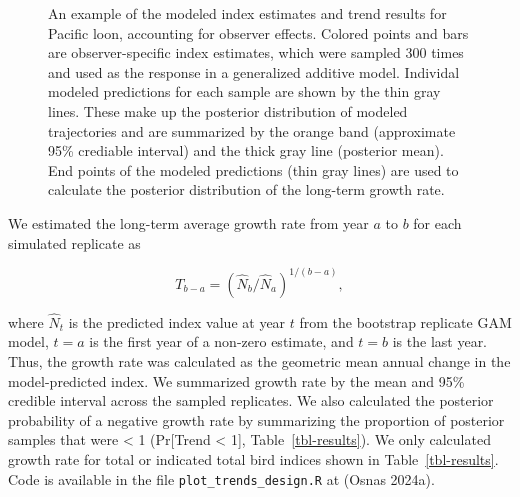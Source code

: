 \documentclass[
]{article}
\begin{document}
\begin{figure}


\caption{\label{fig-loon}An example of the modeled index estimates and
trend results for Pacific loon, accounting for observer effects. Colored
points and bars are observer-specific index estimates, which were
sampled 300 times and used as the response in a generalized additive
model. Individal modeled predictions for each sample are shown by the
thin gray lines. These make up the posterior distribution of modeled
trajectories and are summarized by the orange band (approximate 95\%
crediable interval) and the thick gray line (posterior mean). End points
of the modeled predictions (thin gray lines) are used to calculate the
posterior distribution of the long-term growth rate.}

\end{figure}%

We estimated the long-term average growth rate from year \(a\) to \(b\)
for each simulated replicate as

\[T_{b-a} = (\hat N_{b}/\hat N_{a})^{1/(b-a)},\]

\newpage{}

where \(\hat N_t\) is the predicted index value at year \(t\) from the
bootstrap replicate GAM model, \(t = a\) is the first year of a non-zero
estimate, and \(t = b\) is the last year. Thus, the growth rate was
calculated as the geometric mean annual change in the model-predicted
index. We summarized growth rate by the mean and 95\% credible interval
across the sampled replicates. We also calculated the posterior
probability of a negative growth rate by summarizing the proportion of
posterior samples that were \textless{} 1 (Pr{[}Trend \textless{} 1{]},
Table~\ref{tbl-results}). We only calculated growth rate for total or
indicated total bird indices shown in Table~\ref{tbl-results}. Code is
available in the file \texttt{plot\_trends\_design.R} at (Osnas 2024a).

\begingroup\fontsize{10}{12}\selectfont
\end{document}
